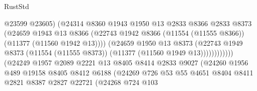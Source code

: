 \begin{lexlean}{RustStd}
\begin{coremodule}
                                          @23599
                                          @23605)
                                        (@24314
                                          @8360
                                          @1943
                                          @1950
                                          @13
                                          @2833
                                          @8366
                                          @2833
                                          @8373
                                          (@24659
                                            @1943
                                            @13
                                            @8366
                                            (@22743
                                              @1942
                                              @8366
                                              (@11554 (@11555 @8366))
                                              (@11377 (@11560 @1942 @13))))
                                          (@24659
                                            @1950
                                            @13
                                            @8373
                                            (@22743
                                              @1949
                                              @8373
                                              (@11554 (@11555 @8373))
                                              (@11377 (@11560 @1949 @13))))))))))))
                          (@24249
                            @1957
                            @2089
                            @2221
                            @13
                            @8405
                            @8414
                            @2833
                            @9027
                            (@24260
                              @1956
                              @489
                              @19158
                              @8405
                              @8412
                              @6188
                              (@24269
                                @726
                                @53
                                @55
                                @4651
                                @8404
                                @8411
                                @2821
                                @8387
                                @2827
                                @22721
                                (@24268
                                  @724
                                  @103

\end{coremodule}
\end{lexlean}
